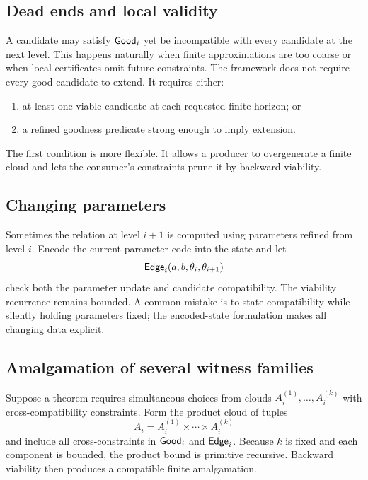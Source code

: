 \subsection{Dead ends and local validity}

A candidate may satisfy \(\mathsf{Good}_i\) yet be incompatible with every candidate at the next level.  This happens naturally when finite approximations are too coarse or when local certificates omit future constraints.  The framework does not require every good candidate to extend.  It requires either:

\begin{enumerate}
\item at least one viable candidate at each requested finite horizon; or
\item a refined goodness predicate strong enough to imply extension.
\end{enumerate}

The first condition is more flexible.  It allows a producer to overgenerate a finite cloud and lets the consumer's constraints prune it by backward viability.

\subsection{Changing parameters}

Sometimes the relation at level \(i+1\) is computed using parameters refined from level \(i\).  Encode the current parameter code into the state and let
\[
 \mathsf{Edge}_i(a,b,\theta_i,\theta_{i+1})
\]
check both the parameter update and candidate compatibility.  The viability recurrence remains bounded.  A common mistake is to state compatibility while silently holding parameters fixed; the encoded-state formulation makes all changing data explicit.

\subsection{Amalgamation of several witness families}

Suppose a theorem requires simultaneous choices from clouds \(A_i^{(1)},\ldots,A_i^{(k)}\) with cross-compatibility constraints.  Form the product cloud of tuples
\[
 A_i=A_i^{(1)}\times\cdots\times A_i^{(k)}
\]
and include all cross-constraints in \(\mathsf{Good}_i\) and \(\mathsf{Edge}_i\).  Because \(k\) is fixed and each component is bounded, the product bound is primitive recursive.  Backward viability then produces a compatible finite amalgamation.


